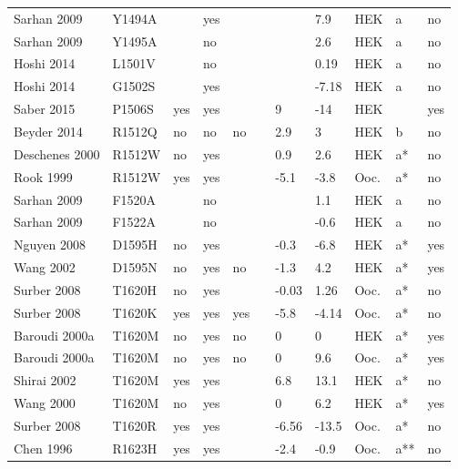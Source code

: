\begin{tiny}
\begin{longtable}{p{4cm}|l|llll|ll|lll}
Sarhan 2009\cite{Sarhan2009MutationDB} & Y1494A &  & yes &  &  &  & 7.9 & HEK & a & no \\
Sarhan 2009\cite{Sarhan2009MutationDB} & Y1495A &  & no &  &  &  & 2.6 & HEK & a & no \\
Hoshi 2014\cite{Hoshi2014MutationDB} & L1501V &  & no &  &  &  & 0.19 & HEK & a & no \\
Hoshi 2014\cite{Hoshi2014MutationDB} & G1502S &  & yes &  &  &  & -7.18 & HEK & a & no \\
Saber 2015\cite{Saber2015MutationDB} & P1506S & yes & yes &  &  & 9 & -14 & HEK &  & yes \\
Beyder 2014\cite{Beyder2014MutationDB} & R1512Q & no & no & no &  & 2.9 & 3 & HEK & b & no \\
Deschenes 2000\cite{Deschenes2000MutationDB} & R1512W & no & yes &  &  & 0.9 & 2.6 & HEK & a* & no \\
Rook 1999\cite{Rook1999MutationDB} & R1512W & yes & yes &  &  & -5.1 & -3.8 & Ooc. & a* & no \\
Sarhan 2009\cite{Sarhan2009MutationDB} & F1520A &  & no &  &  &  & 1.1 & HEK & a & no \\
Sarhan 2009\cite{Sarhan2009MutationDB} & F1522A &  & no &  &  &  & -0.6 & HEK & a & no \\
Nguyen 2008\cite{Nguyen2008MutationDB} & D1595H & no & yes &  &  & -0.3 & -6.8 & HEK & a* & yes \\
Wang 2002\cite{Wang2002MutationDB} & D1595N & no & yes & no &  & -1.3 & 4.2 & HEK & a* & yes \\
Surber 2008\cite{Surber2008MutationDB} & T1620H & no & yes &  &  & -0.03 & 1.26 & Ooc. & a* & no \\
Surber 2008\cite{Surber2008MutationDB} & T1620K & yes & yes & yes &  & -5.8 & -4.14 & Ooc. & a* & no \\
Baroudi 2000a\cite{Baroudi2000aMutationDB} & T1620M & no & yes & no &  & 0 & 0 & HEK & a* & yes \\
Baroudi 2000a\cite{Baroudi2000aMutationDB} & T1620M & no & yes & no &  & 0 & 9.6 & Ooc. & a* & yes \\
Shirai 2002\cite{Shirai2002MutationDB} & T1620M & yes & yes &  &  & 6.8 & 13.1 & HEK & a* & no \\
Wang 2000\cite{Wang2000MutationDB} & T1620M & no & yes &  &  & 0 & 6.2 & HEK & a* & yes \\
Surber 2008\cite{Surber2008MutationDB} & T1620R & yes & yes &  &  & -6.56 & -13.5 & Ooc. & a* & no \\
Chen 1996\cite{Chen1996MutationDB} & R1623H & yes & yes &  &  & -2.4 & -0.9 & Ooc. & a** & no \\

\end{longtable}
\end{tiny}
